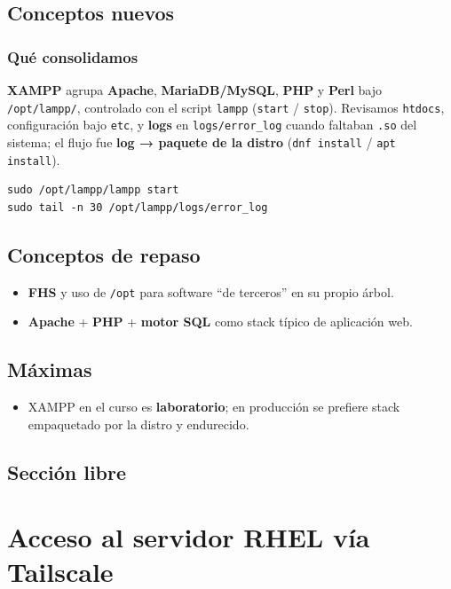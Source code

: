 \documentclass[11pt, letterpaper]{article}
\begin{document}
\subsection{Conceptos nuevos}
\label{sec:orgfc18ab0}

\subsubsection{Qué consolidamos}
\label{sec:org29c2ac6}
\textbf{XAMPP} agrupa \textbf{Apache}, \textbf{MariaDB/MySQL}, \textbf{PHP} y \textbf{Perl} bajo \texttt{/opt/lampp/}, controlado con el script \texttt{lampp} (\texttt{start} / \texttt{stop}). Revisamos \texttt{htdocs}, configuración bajo \texttt{etc}, y \textbf{logs} en \texttt{logs/error\_log} cuando faltaban \texttt{.so} del sistema; el flujo fue \textbf{log → paquete de la distro} (\texttt{dnf install} / \texttt{apt install}).

\begin{verbatim}
sudo /opt/lampp/lampp start
sudo tail -n 30 /opt/lampp/logs/error_log
\end{verbatim}
\subsection{Conceptos de repaso}
\label{sec:orgf17139f}

\begin{itemize}
\item \textbf{FHS} y uso de \texttt{/opt} para software “de terceros” en su propio árbol.
\item \textbf{Apache} + \textbf{PHP} + \textbf{motor SQL} como stack típico de aplicación web.
\end{itemize}
\subsection{Máximas}
\label{sec:org47107b5}

\begin{itemize}
\item XAMPP en el curso es \textbf{laboratorio}; en producción se prefiere stack empaquetado por la distro y endurecido.
\end{itemize}
\subsection{Sección libre}
\label{sec:orgd8daeea}
\section{Acceso al servidor RHEL vía Tailscale}
\label{sec:org0ee71cb}
\end{document}
